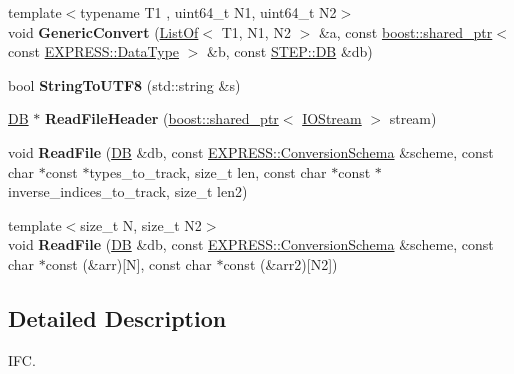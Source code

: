 \begin{DoxyCompactItemize}
\item 
\hypertarget{namespace_assimp_1_1_s_t_e_p_aef49464ba9347da086b9a1b7a0772d67}{{\footnotesize template$<$typename T1 , uint64\+\_\+t N1, uint64\+\_\+t N2$>$ }\\void {\bfseries Generic\+Convert} (\hyperlink{struct_assimp_1_1_s_t_e_p_1_1_list_of}{List\+Of}$<$ T1, N1, N2 $>$ \&a, const \hyperlink{classboost_1_1shared__ptr}{boost\+::shared\+\_\+ptr}$<$ const \hyperlink{class_assimp_1_1_s_t_e_p_1_1_e_x_p_r_e_s_s_1_1_data_type}{E\+X\+P\+R\+E\+S\+S\+::\+Data\+Type} $>$ \&b, const \hyperlink{class_assimp_1_1_s_t_e_p_1_1_d_b}{S\+T\+E\+P\+::\+D\+B} \&db)}\label{namespace_assimp_1_1_s_t_e_p_aef49464ba9347da086b9a1b7a0772d67}

\item 
\hypertarget{namespace_assimp_1_1_s_t_e_p_ad09470bf1063fef700aadcdf12a3b735}{bool {\bfseries String\+To\+U\+T\+F8} (std\+::string \&s)}\label{namespace_assimp_1_1_s_t_e_p_ad09470bf1063fef700aadcdf12a3b735}

\item 
\hypertarget{namespace_assimp_1_1_s_t_e_p_a9fe85f05366c8dff58661b05a4658510}{\hyperlink{class_assimp_1_1_s_t_e_p_1_1_d_b}{D\+B} $\ast$ {\bfseries Read\+File\+Header} (\hyperlink{classboost_1_1shared__ptr}{boost\+::shared\+\_\+ptr}$<$ \hyperlink{class_assimp_1_1_i_o_stream}{I\+O\+Stream} $>$ stream)}\label{namespace_assimp_1_1_s_t_e_p_a9fe85f05366c8dff58661b05a4658510}

\item 
\hypertarget{namespace_assimp_1_1_s_t_e_p_a027e6814ca2b22b56b072426cada30f9}{void {\bfseries Read\+File} (\hyperlink{class_assimp_1_1_s_t_e_p_1_1_d_b}{D\+B} \&db, const \hyperlink{class_assimp_1_1_s_t_e_p_1_1_e_x_p_r_e_s_s_1_1_conversion_schema}{E\+X\+P\+R\+E\+S\+S\+::\+Conversion\+Schema} \&scheme, const char $\ast$const $\ast$types\+\_\+to\+\_\+track, size\+\_\+t len, const char $\ast$const $\ast$inverse\+\_\+indices\+\_\+to\+\_\+track, size\+\_\+t len2)}\label{namespace_assimp_1_1_s_t_e_p_a027e6814ca2b22b56b072426cada30f9}

\item 
\hypertarget{namespace_assimp_1_1_s_t_e_p_abfedf370e5ada526f0646d9e4f964342}{{\footnotesize template$<$size\+\_\+t N, size\+\_\+t N2$>$ }\\void {\bfseries Read\+File} (\hyperlink{class_assimp_1_1_s_t_e_p_1_1_d_b}{D\+B} \&db, const \hyperlink{class_assimp_1_1_s_t_e_p_1_1_e_x_p_r_e_s_s_1_1_conversion_schema}{E\+X\+P\+R\+E\+S\+S\+::\+Conversion\+Schema} \&scheme, const char $\ast$const (\&arr)\mbox{[}N\mbox{]}, const char $\ast$const (\&arr2)\mbox{[}N2\mbox{]})}\label{namespace_assimp_1_1_s_t_e_p_abfedf370e5ada526f0646d9e4f964342}

\end{DoxyCompactItemize}


\subsection{Detailed Description}
I\+F\+C. 